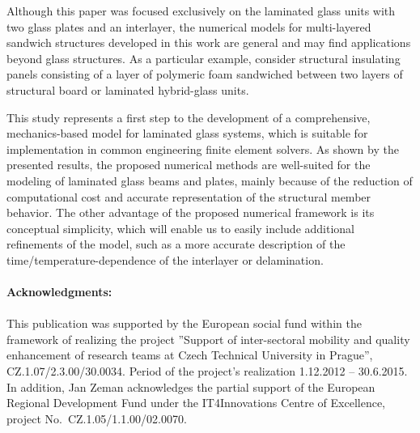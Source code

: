 \documentclass[11pt]{article}
\begin{document}
Although this paper was focused exclusively on the laminated glass units with two glass plates and an interlayer, the numerical models for multi-layered sandwich structures developed in this work are general and may find applications beyond glass structures. As a particular example, consider structural insulating panels consisting of a layer of polymeric foam sandwiched between two layers of structural board or laminated hybrid-glass units. 

This study represents a first step to the development of a comprehensive, mechanics-based model for laminated glass systems, which is suitable for
implementation in common engineering finite element solvers. As shown by the presented results, the proposed numerical methods are well-suited for the
modeling of laminated glass beams and plates, mainly because of the reduction of computational cost and accurate representation of the structural member
behavior. The other advantage of the proposed numerical framework is its conceptual simplicity, which will enable us to easily include additional
refinements of the model, such as a more accurate description of the time/temperature-dependence of the interlayer or delamination. 

\paragraph{Acknowledgments:}
\paragraph{}
This publication was supported by the European social fund within the framework of realizing the project {''Support of inter-sectoral mobility and quality enhancement of research teams at Czech Technical University in Prague'', CZ.1.07/2.3.00/30.0034.}
{Period of the project's realization 1.12.2012 -- 30.6.2015.} In addition, Jan Zeman acknowledges the partial support of the European Regional
Development Fund under the IT4Innovations Centre of Excellence, project No.~CZ.1.05/1.1.00/02.0070.
\end{document}
